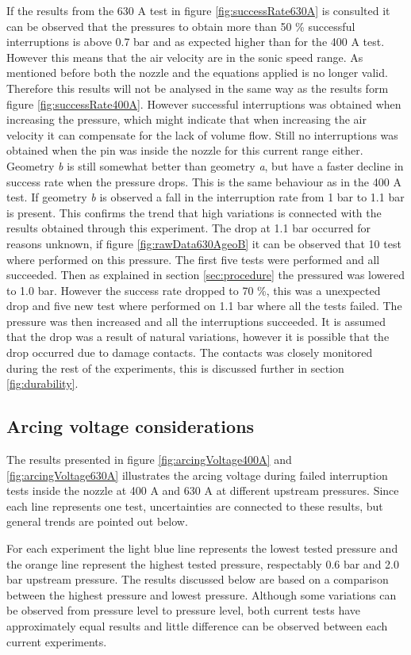 \documentclass[10pt,a4paper,twoside]{article}
\begin{document}
If the results from the 630 A test in figure \ref{fig:successRate630A} is consulted it can be observed that the pressures to obtain more than 50 \% successful interruptions is above 0.7 bar and as expected higher than for the 400 A test. However this means that the air velocity are in the sonic speed range. As mentioned before both the nozzle and the equations applied is no longer valid. Therefore this results will not be analysed in the same way as the results form figure \ref{fig:successRate400A}. However successful interruptions was obtained when increasing the pressure, which might indicate that when increasing the air velocity it can compensate for the lack of volume flow. Still no interruptions was obtained when the pin was inside the nozzle for this current range either. Geometry \textit{b} is still somewhat better than geometry \textit{a}, but have a faster decline in success rate when the pressure drops. This is the same behaviour as in the 400 A test. If geometry \textit{b} is observed a fall in the interruption rate from 1 bar to 1.1 bar is present. This confirms the trend that high variations is connected with the results obtained through this experiment. The drop at 1.1 bar occurred for reasons unknown, if figure \ref{fig:rawData630AgeoB} it can be observed that 10 test where performed on this pressure. The first five tests were performed and all succeeded. Then as explained in section \ref{sec:procedure} the pressured was lowered to 1.0 bar. However the success rate dropped to 70 \%, this was a unexpected drop and five new test where performed on 1.1 bar where all the tests failed. The pressure was then increased and all the interruptions succeeded. It is assumed that the drop was a result of natural variations, however it is possible that the drop occurred due to damage contacts. The contacts was closely monitored during the rest of the experiments, this is discussed further in section \ref{fig:durability}.

\subsection{Arcing voltage considerations}
The results presented in figure \ref{fig:arcingVoltage400A} and \ref{fig:arcingVoltage630A} illustrates the arcing voltage during failed interruption tests inside the nozzle at 400 A and 630 A at different upstream pressures. Since each line represents one test, uncertainties are connected to these results, but general trends are pointed out below.

For each experiment the light blue line represents the lowest tested pressure and the orange line represent the highest tested pressure, respectably 0.6 bar and 2.0 bar upstream pressure. The results discussed below are based on a comparison between the highest pressure and lowest pressure. Although some variations can be observed from pressure level to pressure level, both current tests have approximately equal results and little difference can be observed between each current experiments.
\end{document}
